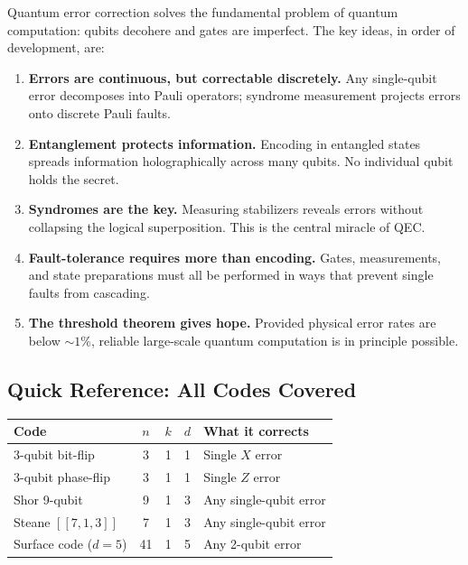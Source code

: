 \documentclass[11pt, a4paper]{article}
\theoremstyle{definition}
\theoremstyle{plain}
\theoremstyle{remark}
\newcommand{\code}[1]{[\![#1]\!]}
\begin{document}
Quantum error correction solves the fundamental problem of quantum
computation: qubits decohere and gates are imperfect.  The key ideas, in
order of development, are:

\begin{enumerate}
  \item \textbf{Errors are continuous, but correctable discretely.}
        Any single-qubit error decomposes into Pauli operators; syndrome
        measurement projects errors onto discrete Pauli faults.

  \item \textbf{Entanglement protects information.}
        Encoding in entangled states spreads information holographically
        across many qubits.  No individual qubit holds the secret.

  \item \textbf{Syndromes are the key.}
        Measuring stabilizers reveals errors without collapsing the
        logical superposition.  This is the central miracle of QEC.

  \item \textbf{Fault-tolerance requires more than encoding.}
        Gates, measurements, and state preparations must all be performed
        in ways that prevent single faults from cascading.

  \item \textbf{The threshold theorem gives hope.}
        Provided physical error rates are below $\sim 1\%$, reliable
        large-scale quantum computation is in principle possible.
\end{enumerate}

\subsection{Quick Reference: All Codes Covered}

\begin{center}
\renewcommand{\arraystretch}{1.5}
\begin{tabular}{@{} l c c c l @{}}
  \toprule
  \textbf{Code} & $n$ & $k$ & $d$ & \textbf{What it corrects}\\
  \midrule
  3-qubit bit-flip & 3 & 1 & 1 & Single $X$ error\\
  3-qubit phase-flip & 3 & 1 & 1 & Single $Z$ error\\
  Shor 9-qubit & 9 & 1 & 3 & Any single-qubit error\\
  Steane $\code{7,1,3}$ & 7 & 1 & 3 & Any single-qubit error\\
  Surface code ($d=5$) & 41 & 1 & 5 & Any 2-qubit error\\
  \bottomrule
\end{tabular}
\end{center}
\end{document}
